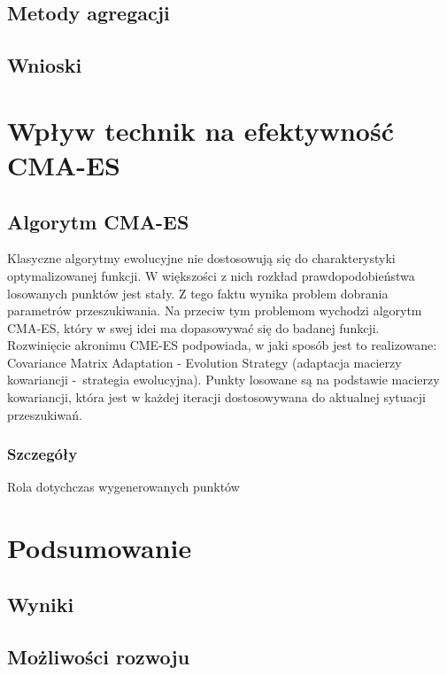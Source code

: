 \documentclass{mini}
\begin{document}
\subsection{Metody agregacji}

\subsection{Wnioski}

\pagebreak

\section{Wpływ technik na efektywność CMA-ES}

\subsection{Algorytm CMA-ES}
Klasyczne algorytmy ewolucyjne nie dostosowują się do charakterystyki optymalizowanej funkcji. W większości z nich rozkład prawdopodobieństwa losowanych punktów jest stały. Z tego faktu wynika problem dobrania parametrów przeszukiwania. Na przeciw tym problemom wychodzi algorytm CMA-ES, który w swej idei ma dopasowywać się do badanej funkcji.\\
Rozwinięcie akronimu CME-ES podpowiada, w jaki sposób jest to realizowane: Covariance Matrix Adaptation - Evolution Strategy (adaptacja macierzy kowariancji -~strategia ewolucyjna). Punkty losowane są na podstawie macierzy kowariancji, która jest w każdej iteracji dostosowywana do aktualnej sytuacji przeszukiwań.

\subsubsection*{Szczegóły}
Rola dotychczas wygenerowanych punktów

\pagebreak

\section{Podsumowanie}

\subsection{Wyniki}

\subsection{Możliwości rozwoju}

\pagebreak

\begin{thebibliography}{9}

\end{thebibliography}

\makestatement
\end{document}
